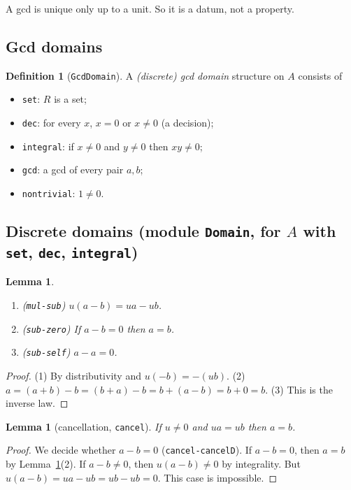 \documentclass[11pt]{amsart}
\newtheorem{lemma}[theorem]{Lemma}
\theoremstyle{definition}
\newtheorem{definition}[theorem]{Definition}
\theoremstyle{remark}
\newcommand{\nm}[1]{\textup{\texttt{#1}}}
\begin{document}
\noindent A gcd is unique only up to a unit. So it is a datum, not a
property.

\subsection{Gcd domains}

\begin{definition}[\nm{GcdDomain}]
A \emph{(discrete) gcd domain} structure on $A$ consists of
\begin{itemize}
\item \nm{set}: $R$ is a set;
\item \nm{dec}: for every $x$, $x=0$ or $x\neq0$ (a decision);
\item \nm{integral}: if $x\neq0$ and $y\neq0$ then $xy\neq0$;
\item \nm{gcd}: a gcd of every pair $a,b$;
\item \nm{nontrivial}: $1\neq0$.
\end{itemize}
\end{definition}

\subsection{Discrete domains (module \nm{Domain}, for $A$ with
\nm{set}, \nm{dec}, \nm{integral})}

\begin{lemma}\label{lem:sub}
\begin{enumerate}
\item (\nm{mul-sub}) $u(a-b) = ua - ub$.
\item (\nm{sub-zero}) If $a - b = 0$ then $a = b$.
\item (\nm{sub-self}) $a - a = 0$.
\end{enumerate}
\end{lemma}
\begin{proof}
(1) By distributivity and $u(-b) = -(ub)$.
(2) $a = (a+b)-b = (b+a)-b = b+(a-b) = b + 0 = b$.
(3) This is the inverse law.
\end{proof}

\begin{lemma}[cancellation, \nm{cancel}]\label{lem:cancel}
If $u\neq0$ and $ua = ub$ then $a=b$.
\end{lemma}
\begin{proof}
We decide whether $a-b=0$ (\nm{cancel-cancelD}).
If $a-b = 0$, then $a=b$ by Lemma~\ref{lem:sub}(2).
If $a-b\neq0$, then $u(a-b)\neq0$ by integrality. But
$u(a-b) = ua - ub = ub - ub = 0$. This case is impossible.
\end{proof}
\end{document}
